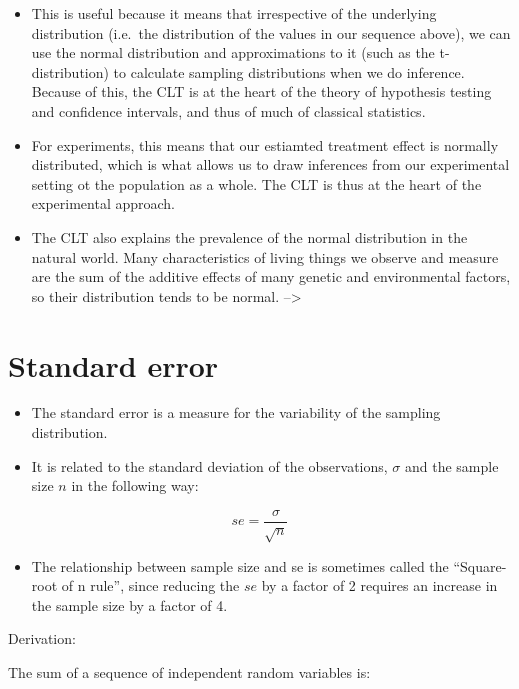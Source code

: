 \documentclass[
  letterpaper,
  DIV=11,
  numbers=noendperiod]{scrreprt}
\providecommand{\tightlist}{%
  \setlength{\itemsep}{0pt}\setlength{\parskip}{0pt}}\usepackage{longtable,booktabs,array}
\begin{document}
\begin{itemize}
\item
  This is useful because it means that irrespective of the underlying
  distribution (i.e.~the distribution of the values in our sequence
  above), we can use the normal distribution and approximations to it
  (such as the t-distribution) to calculate sampling distributions when
  we do inference. Because of this, the CLT is at the heart of the
  theory of hypothesis testing and confidence intervals, and thus of
  much of classical statistics.
\item
  For experiments, this means that our estiamted treatment effect is
  normally distributed, which is what allows us to draw inferences from
  our experimental setting ot the population as a whole. The CLT is thus
  at the heart of the experimental approach.
\item
  The CLT also explains the prevalence of the normal distribution in the
  natural world. Many characteristics of living things we observe and
  measure are the sum of the additive effects of many genetic and
  environmental factors, so their distribution tends to be normal.
  --\textgreater{}
\end{itemize}

\hypertarget{standard-error}{%
\section{Standard error}\label{standard-error}}

\begin{itemize}
\item
  The standard error is a measure for the variability of the sampling
  distribution.
\item
  It is related to the standard deviation of the observations,
  \(\sigma\) and the sample size \(n\) in the following way:
\end{itemize}

\[
se = \frac{\sigma}{\sqrt{n}}
\]

\begin{itemize}
\tightlist
\item
  The relationship between sample size and se is sometimes called the
  ``Square-root of n rule'', since reducing the \(se\) by a factor of 2
  requires an increase in the sample size by a factor of 4.
\end{itemize}

Derivation:

The sum of a sequence of independent random variables is:
\end{document}
